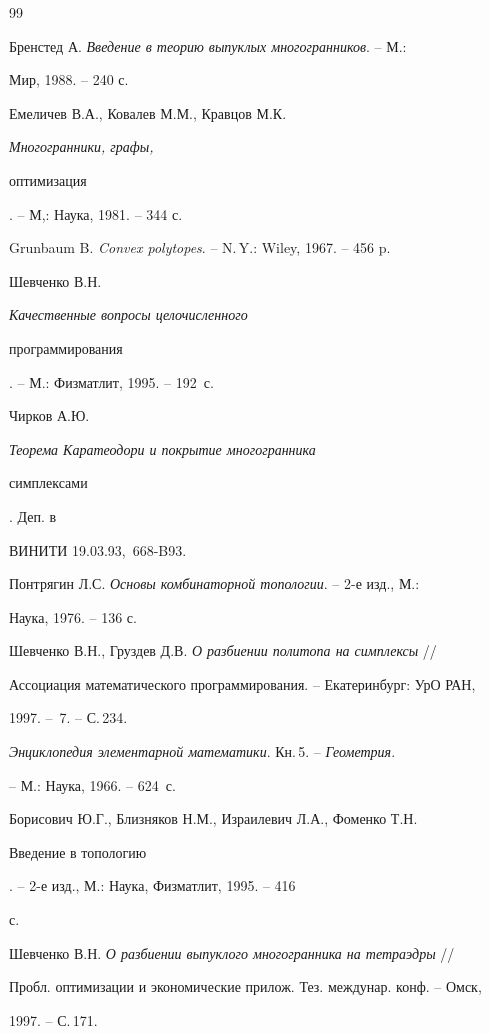 \begin{thebibliography}{99}







Бренстед А. {\em Введение в теорию выпуклых многогранников}. -- М.:


Мир, 1988. -- 240 с.




Емеличев В.А., Ковалев М.М., Кравцов М.К. {\em Многогранники, графы,


оптимизация}. -- М,: Наука, 1981. -- 344 с.




Grunbaum B. {\em Convex polytopes}. -- N.\,Y.: Wiley, 1967. -- 456 p.




Шевченко В.Н. {\em Качественные вопросы целочисленного


программирования}. -- М.: Физматлит, 1995. -- 192~с.




Чирков А.Ю. {\em Теорема Каратеодори и покрытие многогранника


симплексами}. Деп. в \linebreak


ВИНИТИ 19.03.93, \No\,668-B93.




Понтрягин Л.С. {\em Основы комбинаторной топологии}. -- 2-е изд., М.:


Наука, 1976. -- 136 с.




Шевченко В.Н., Груздев Д.В. {\em О разбиении политопа на симплексы} //


Ассоциация математического программирования. -- Екатеринбург: УрО РАН,


1997. -- \No\,7. -- С.\,234.




{\em Энциклопедия элементарной математики}. Кн.\,5. -- {\em Геометрия}.


-- М.: Наука, 1966. -- 624~с.




Борисович Ю.Г., Близняков Н.М., Израилевич Л.А., Фоменко Т.Н. {\em


Введение в топологию}. -- 2-е изд., М.: Наука, Физматлит, 1995. -- 416


с.




Шевченко В.Н. {\em О разбиении выпуклого многогранника на тетраэдры} //


Пробл. оптимизации и экономические прилож. Тез. междунар. конф. -- Омск,


1997. -- С.\,171.





\end{thebibliography}





\vskip 2cm















